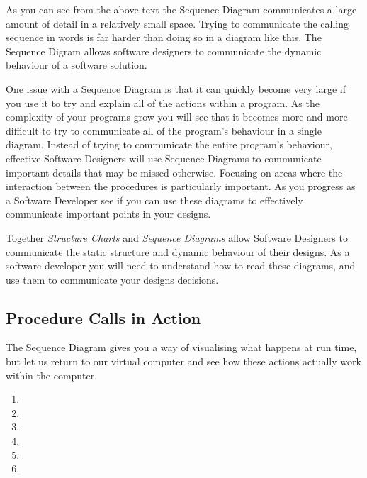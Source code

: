 As you can see from the above text the Sequence Diagram communicates a large amount of detail in a relatively small space. Trying to communicate the calling sequence in words is far harder than doing so in a diagram like this. The Sequence Digram allows software designers to communicate the dynamic behaviour of a software solution.

One issue with a Sequence Diagram is that it can quickly become very large if you use it to try and explain all of the actions within a program. As the complexity of your programs grow you will see that it becomes more and more difficult to try to communicate all of the program's behaviour in a single diagram. Instead of trying to communicate the entire program's behaviour, effective Software Designers will use Sequence Diagrams to communicate important details that may be missed otherwise. Focusing on areas where the interaction between the procedures is particularly important. As you progress as a Software Developer see if you can use these diagrams to effectively communicate important points in your designs.

\bigskip

Together \emph{Structure Charts} and \emph{Sequence Diagrams} allow Software Designers to communicate the static structure and dynamic behaviour of their designs. As a software developer you will need to understand how to read these diagrams, and use them to communicate your designs decisions.


\subsection{Procedure Calls in Action} %
\label{sub:procedure_calls_in_action}

The Sequence Diagram gives you a way of visualising what happens at run time, but let us return to our virtual computer and see how these actions actually work within the computer. 

\begin{enumerate}
  \item {}
  \item {}
  \item {}
  \item {}
  \item {}
  \item {}
\end{enumerate}

